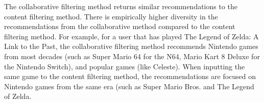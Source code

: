 The collaborative filtering method returns similar recommendations to the content filtering method. There is empirically higher diversity in the recommendations from the collaborative method compared to the content filtering method. For example, for a user that has played The Legend of Zelda: A Link to the Past, the collaborative filtering method recommends Nintendo games from most decades (such as Super Mario 64 for the N64, Mario Kart 8 Deluxe for the Nintendo Switch), and popular games (like Celeste). When inputting the same game to the content filtering method, the recommendations are focused on Nintendo games from the same era (such as Super Mario Bros. and The Legend of Zelda.